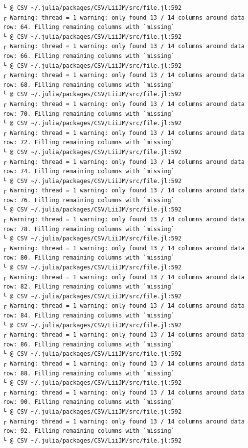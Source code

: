 \documentclass[
  letterpaper,
  DIV=11,
  numbers=noendperiod]{scrartcl}
\begin{document}
\begin{verbatim}
└ @ CSV ~/.julia/packages/CSV/LiiJM/src/file.jl:592
┌ Warning: thread = 1 warning: only found 13 / 14 columns around data row: 64. Filling remaining columns with `missing`
└ @ CSV ~/.julia/packages/CSV/LiiJM/src/file.jl:592
┌ Warning: thread = 1 warning: only found 13 / 14 columns around data row: 66. Filling remaining columns with `missing`
└ @ CSV ~/.julia/packages/CSV/LiiJM/src/file.jl:592
┌ Warning: thread = 1 warning: only found 13 / 14 columns around data row: 68. Filling remaining columns with `missing`
└ @ CSV ~/.julia/packages/CSV/LiiJM/src/file.jl:592
┌ Warning: thread = 1 warning: only found 13 / 14 columns around data row: 70. Filling remaining columns with `missing`
└ @ CSV ~/.julia/packages/CSV/LiiJM/src/file.jl:592
┌ Warning: thread = 1 warning: only found 13 / 14 columns around data row: 72. Filling remaining columns with `missing`
└ @ CSV ~/.julia/packages/CSV/LiiJM/src/file.jl:592
┌ Warning: thread = 1 warning: only found 13 / 14 columns around data row: 74. Filling remaining columns with `missing`
└ @ CSV ~/.julia/packages/CSV/LiiJM/src/file.jl:592
┌ Warning: thread = 1 warning: only found 13 / 14 columns around data row: 76. Filling remaining columns with `missing`
└ @ CSV ~/.julia/packages/CSV/LiiJM/src/file.jl:592
┌ Warning: thread = 1 warning: only found 13 / 14 columns around data row: 78. Filling remaining columns with `missing`
└ @ CSV ~/.julia/packages/CSV/LiiJM/src/file.jl:592
┌ Warning: thread = 1 warning: only found 13 / 14 columns around data row: 80. Filling remaining columns with `missing`
└ @ CSV ~/.julia/packages/CSV/LiiJM/src/file.jl:592
┌ Warning: thread = 1 warning: only found 13 / 14 columns around data row: 82. Filling remaining columns with `missing`
└ @ CSV ~/.julia/packages/CSV/LiiJM/src/file.jl:592
┌ Warning: thread = 1 warning: only found 13 / 14 columns around data row: 84. Filling remaining columns with `missing`
└ @ CSV ~/.julia/packages/CSV/LiiJM/src/file.jl:592
┌ Warning: thread = 1 warning: only found 13 / 14 columns around data row: 86. Filling remaining columns with `missing`
└ @ CSV ~/.julia/packages/CSV/LiiJM/src/file.jl:592
┌ Warning: thread = 1 warning: only found 13 / 14 columns around data row: 88. Filling remaining columns with `missing`
└ @ CSV ~/.julia/packages/CSV/LiiJM/src/file.jl:592
┌ Warning: thread = 1 warning: only found 13 / 14 columns around data row: 90. Filling remaining columns with `missing`
└ @ CSV ~/.julia/packages/CSV/LiiJM/src/file.jl:592
┌ Warning: thread = 1 warning: only found 13 / 14 columns around data row: 92. Filling remaining columns with `missing`
└ @ CSV ~/.julia/packages/CSV/LiiJM/src/file.jl:592

\end{verbatim}
\end{document}
